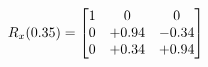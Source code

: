 \documentclass[preview]{standalone}
\begin{document}
\begin{align*}
\special{dvisvgm:raw <g id='unique000'>}R_{x}(0.35) = \begin{bmatrix}1 & 0 & 0 \\0 & +0.94 & -0.34 \\0 & +0.34 & +0.94\end{bmatrix}\special{dvisvgm:raw </g>}
\end{align*}
\end{document}
